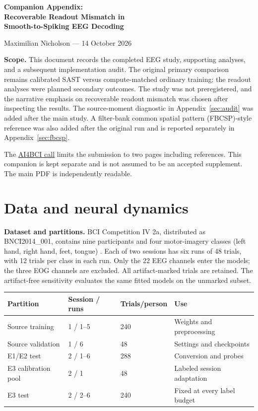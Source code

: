 \documentclass[11pt,a4paper]{article}
\begin{document}
\begin{center}
{\Large\bfseries Companion Appendix:\\
Recoverable Readout Mismatch in\\Smooth-to-Spiking EEG Decoding\par}
\medskip
Maximilian Nicholson --- 14 October 2026
\end{center}

\textbf{Scope.} This document records the completed EEG study, supporting
analyses, and a subsequent implementation audit. The original primary
comparison remains calibrated SAST versus compute-matched ordinary training;
the readout analyses were planned secondary outcomes. The study was not
preregistered, and the narrative emphasis on recoverable readout mismatch
was chosen after inspecting the results. The source-moment diagnostic in
Appendix~\ref{sec:audit} was added after the main study.
A filter-bank common spatial pattern (FBCSP)-style reference was also added after the original run
and is reported separately in Appendix~\ref{sec:fbcsp}.

The \href{https://www.ai4bci.com/#cfp}{AI4BCI call} limits the submission to two
pages including references. This companion is kept separate and is not
assumed to be an accepted supplement. The main PDF is independently readable.

\appendix
\section{Data and neural dynamics}

\textbf{Dataset and partitions.} BCI Competition IV 2a, distributed as
BNCI2014\_001, contains nine participants and four motor-imagery classes
(left hand, right hand, feet, tongue) \citep{brunner}. Each of two sessions
has six runs of 48 trials, with 12 trials per class in each run. Only the
22 EEG channels enter the models; the three EOG channels are excluded.
All artifact-marked trials are retained. The artifact-free sensitivity
evaluates the same fitted models on the unmarked subset.

\begin{center}\small
\begin{tabular}{llll}
\toprule
Partition & Session / runs & Trials/person & Use \\
\midrule
Source training & 1 / 1--5 & 240 & Weights and preprocessing \\
Source validation & 1 / 6 & 48 & Settings and checkpoints \\
E1/E2 test & 2 / 1--6 & 288 & Conversion and probes \\
E3 calibration pool & 2 / 1 & 48 & Labeled session adaptation \\
E3 test & 2 / 2--6 & 240 & Fixed at every label budget \\
\bottomrule
\end{tabular}\end{center}
\end{document}
